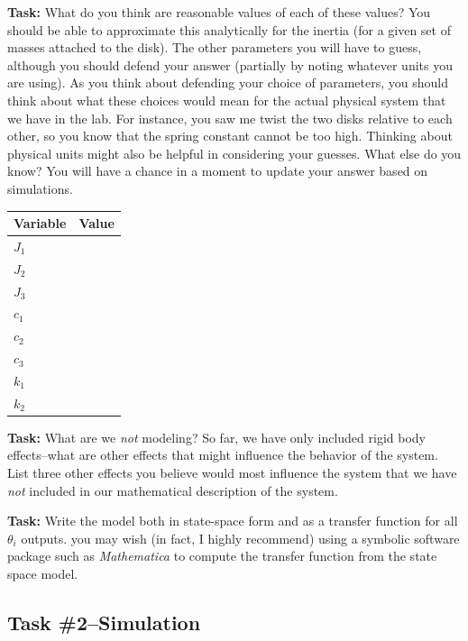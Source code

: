 \noindent \textbf{Task:} What do you think are reasonable values of each of
these values?  You should be able to approximate this analytically for the
inertia (for a given set of masses attached to the disk).  The other parameters
you will have to guess, although you should defend your answer (partially by
noting whatever units you are using).  As you think about defending your choice
of parameters, you should think about what these choices would mean for the
actual physical system that we have in the lab.  For instance, you saw me twist
the two disks relative to each other, so you know that the spring constant
cannot be too high.  Thinking about physical units might also be helpful in
considering your guesses. What else do you know?  You will have a chance in a
moment to update your answer based on simulations.



\vspace{.2in}
\begin{tabular}{||l|l||}
\hline
Variable & \hspace{2in}Value \\
\hline
$J_1$ & \\
\hline
$J_2$ & \\
\hline
$J_3$ & \\
\hline
$c_1$ & \\
\hline
$c_2$ & \\
\hline
$c_3$ & \\
\hline
$k_1$ & \\
\hline
$k_2$ & \\
\hline
\end{tabular}
\vspace{.2in}

\noindent \textbf{Task:}  What are we \emph{not} modeling?  So far, we have only
included rigid body effects--what are other effects that might influence the
behavior of the system.  List three other effects you believe would most
influence the system that we have \emph{not} included in our mathematical
description of the system.

\noindent \textbf{Task:} Write the model both in state-space form and as a 
transfer function for all $\theta_i$ outputs.  you may wish (in fact, I highly
recommend) using a symbolic software package such as \emph{Mathematica} to
compute the transfer function from the state space model.

\subsection{Task \#2--Simulation}

